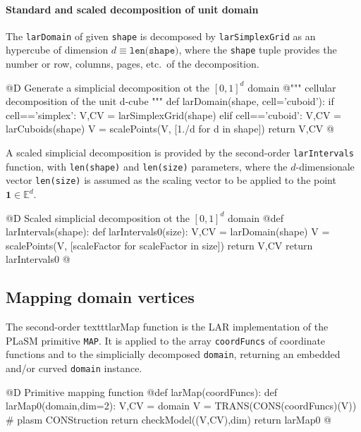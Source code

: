 \documentclass[11pt,oneside]{article}	%
\def\E{\mathbb{E}}
\begin{document}
\paragraph{Standard and scaled decomposition of unit domain}
The \texttt{larDomain} of given \texttt{shape} is decomposed by \texttt{larSimplexGrid} as an hypercube of dimension $d \equiv\texttt{len(shape)}$, where the \texttt{shape} tuple provides the number or row, columns, pages, etc.~of the decomposition.

@D Generate a simplicial decomposition ot the $[0,1]^d$ domain
@{""" cellular decomposition of the unit d-cube """
def larDomain(shape, cell='cuboid'):
	if cell=='simplex': V,CV = larSimplexGrid(shape)
	elif cell=='cuboid': V,CV = larCuboids(shape)
	V = scalePoints(V, [1./d for d in shape])
	return V,CV
@}

A scaled simplicial decomposition is provided by the second-order  \texttt{larIntervals} function, with \texttt{len(shape)} and \texttt{len(size)} parameters, where the $d$-dimensionale vector \texttt{len(size)} is assumed as the scaling vector to be applied to the point $\mathbf{1}\in\E^d$.

@D Scaled simplicial decomposition ot the $[0,1]^d$ domain
@{def larIntervals(shape):
	def larIntervals0(size):
		V,CV = larDomain(shape)
		V = scalePoints(V, [scaleFactor for scaleFactor in size])
		return V,CV
	return larIntervals0
@}

\subsection{Mapping domain vertices}
The second-order texttt{larMap} function is the LAR implementation of the PLaSM primitive \texttt{MAP}.
It is applied to the array \texttt{coordFuncs} of coordinate functions and to the simplicially decomposed  \texttt{domain}, returning an embedded and/or curved \texttt{domain} instance.

@D Primitive mapping function 
@{def larMap(coordFuncs):
	def larMap0(domain,dim=2):
		V,CV = domain
		V = TRANS(CONS(coordFuncs)(V))  # plasm CONStruction
		return checkModel((V,CV),dim)
	return larMap0
@}
\end{document}
